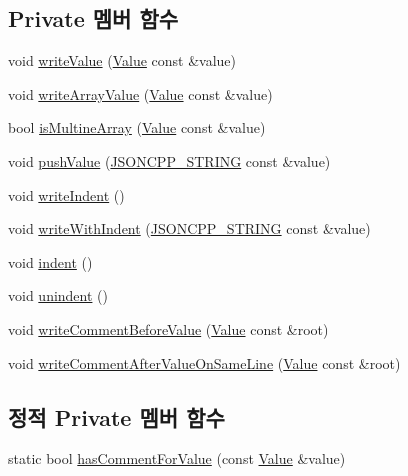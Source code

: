 \subsection*{Private 멤버 함수}
\begin{DoxyCompactItemize}
\item 
void \hyperlink{struct_json_1_1_built_styled_stream_writer_a7c9da861861e570a51b45f270c9ff150}{write\+Value} (\hyperlink{class_json_1_1_value}{Value} const \&value)
\item 
void \hyperlink{struct_json_1_1_built_styled_stream_writer_acd20e9274bbcf7876ef3af2e7d23a31f}{write\+Array\+Value} (\hyperlink{class_json_1_1_value}{Value} const \&value)
\item 
bool \hyperlink{struct_json_1_1_built_styled_stream_writer_af423fd33b3d580506ea3efc53b05a077}{is\+Multine\+Array} (\hyperlink{class_json_1_1_value}{Value} const \&value)
\item 
void \hyperlink{struct_json_1_1_built_styled_stream_writer_a91e8535508412eea04d77c0cafdf15aa}{push\+Value} (\hyperlink{json_8h_a1e723f95759de062585bc4a8fd3fa4be}{J\+S\+O\+N\+C\+P\+P\+\_\+\+S\+T\+R\+I\+NG} const \&value)
\item 
void \hyperlink{struct_json_1_1_built_styled_stream_writer_a2b38a3714d415c4bd3b4812897130f3d}{write\+Indent} ()
\item 
void \hyperlink{struct_json_1_1_built_styled_stream_writer_a6e80e1a0d5f64df2ec48c3c3b1284990}{write\+With\+Indent} (\hyperlink{json_8h_a1e723f95759de062585bc4a8fd3fa4be}{J\+S\+O\+N\+C\+P\+P\+\_\+\+S\+T\+R\+I\+NG} const \&value)
\item 
void \hyperlink{struct_json_1_1_built_styled_stream_writer_a73e09692a2cfbd6e67836b060dc34a9f}{indent} ()
\item 
void \hyperlink{struct_json_1_1_built_styled_stream_writer_a0da6c6f603e00c8c6e38af553edd8c55}{unindent} ()
\item 
void \hyperlink{struct_json_1_1_built_styled_stream_writer_a32c4afca4e08fba79bb0a80a8010283a}{write\+Comment\+Before\+Value} (\hyperlink{class_json_1_1_value}{Value} const \&root)
\item 
void \hyperlink{struct_json_1_1_built_styled_stream_writer_a89625b134fce0255263ca40e6125742b}{write\+Comment\+After\+Value\+On\+Same\+Line} (\hyperlink{class_json_1_1_value}{Value} const \&root)
\end{DoxyCompactItemize}
\subsection*{정적 Private 멤버 함수}
\begin{DoxyCompactItemize}
\item 
static bool \hyperlink{struct_json_1_1_built_styled_stream_writer_a457c2f3c1e8c952caeb60e52477d0c9a}{has\+Comment\+For\+Value} (const \hyperlink{class_json_1_1_value}{Value} \&value)
\end{DoxyCompactItemize}
